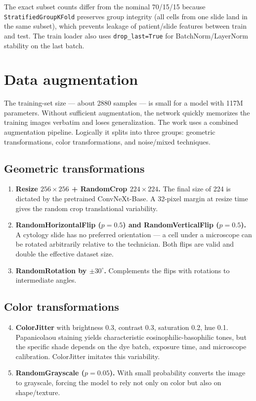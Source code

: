 \documentclass[14pt,a4paper]{extreport}
\begin{document}
The exact subset counts differ from the nominal 70/15/15 because
\texttt{StratifiedGroupKFold} preserves group integrity (all cells from
one slide land in the same subset), which prevents leakage of
patient/slide features between train and test. The train loader also
uses \texttt{drop\_last=True} for BatchNorm/LayerNorm stability on the
last batch.

\section{Data augmentation}
\label{sec:augmentation}

The training-set size --- about 2880 samples --- is small for a model
with 117M parameters. Without sufficient augmentation, the network
quickly memorizes the training images verbatim and loses
generalization. The work uses a combined augmentation pipeline.
Logically it splits into three groups: geometric transformations, color
transformations, and noise/mixed techniques.

\subsection{Geometric transformations}

\begin{enumerate}
    \item \textbf{Resize $256 \times 256$ + RandomCrop $224 \times 224$.}
          The final size of 224 is dictated by the pretrained
          ConvNeXt-Base. A 32-pixel margin at resize time gives the
          random crop translational variability.
    \item \textbf{RandomHorizontalFlip ($p=0.5$) and
          RandomVerticalFlip ($p=0.5$).} A cytology slide has no
          preferred orientation --- a cell under a microscope can be
          rotated arbitrarily relative to the technician. Both flips are
          valid and double the effective dataset size.
    \item \textbf{RandomRotation by $\pm 30^\circ$.} Complements the
          flips with rotations to intermediate angles.
\end{enumerate}

\subsection{Color transformations}

\begin{enumerate}
    \setcounter{enumi}{3}
    \item \textbf{ColorJitter} with brightness 0.3, contrast 0.3,
          saturation 0.2, hue 0.1. Papanicolaou staining yields
          characteristic eosinophilic-basophilic tones, but the specific
          shade depends on the dye batch, exposure time, and microscope
          calibration. ColorJitter imitates this variability.
    \item \textbf{RandomGrayscale ($p=0.05$).} With small probability
          converts the image to grayscale, forcing the model to rely not
          only on color but also on shape/texture.
\end{enumerate}
\end{document}

